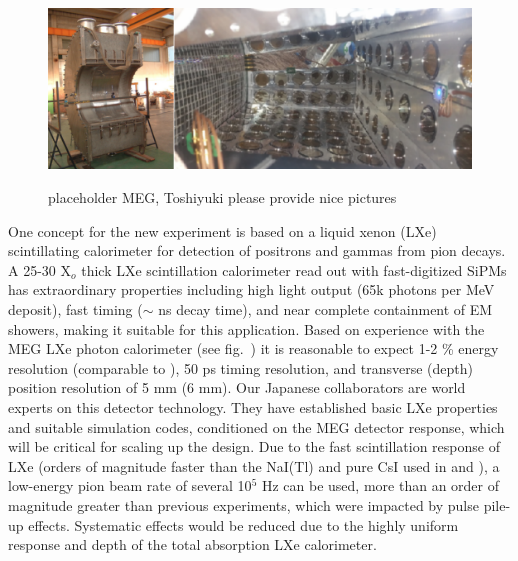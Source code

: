 \begin{figure}[h!]
\centering
\includegraphics[scale=.4]{sections/figures/calo.meg.png}\vspace{3mm}\\
\caption{placeholder MEG, Toshiyuki please provide nice pictures}
\label{fig:calo.meg}
\end{figure}

One  concept for the new experiment is based on a liquid xenon (LXe) scintillating calorimeter for detection of positrons and gammas from pion decays. A 25-30 X$_o$ thick LXe scintillation calorimeter read out with fast-digitized SiPMs
has extraordinary properties including high light output (65k photons per MeV deposit), fast timing
($\sim$ ns decay time), and near complete containment of EM showers, making it suitable for this
application. Based on experience with the MEG LXe photon calorimeter \cite{Baldini} (see fig.~\cite{fig:calo.meg}) it is reasonable to
expect 1-2 \% energy resolution (comparable to \cite{Aguilar-Arevalo3} ), 50 ps timing resolution, and transverse (depth) position resolution of 5 mm 
(6 mm). Our Japanese collaborators are world experts on this detector technology. They have established basic LXe properties and suitable
simulation codes, conditioned on the MEG detector response, which will be critical for scaling up the design. 
Due to the fast scintillation response of LXe (orders of magnitude faster than the NaI(Tl) and
pure CsI used in \cite{Aguilar-Arevalo1, Aguilar-Arevalo2} and \cite{Pocanic1, Pocanic2}), a low-energy pion beam rate of several 10$^5$ Hz can be used, more than an order of magnitude greater than previous experiments, which were impacted by pulse pile-up effects. Systematic effects would be reduced due to the highly uniform response and depth of the total absorption LXe calorimeter. 

